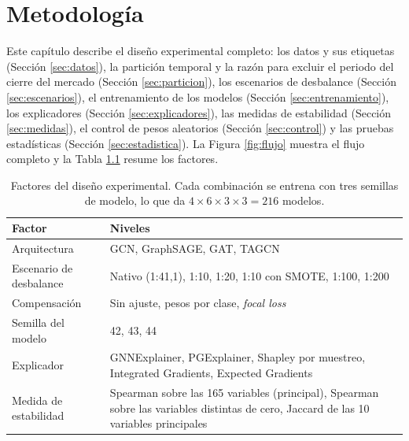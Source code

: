 \chapter{Metodología}\label{cap:metodologia}

Este capítulo describe el diseño experimental completo: los datos y sus etiquetas
(Sección \ref{sec:datos}), la partición temporal y la razón para excluir el periodo del
cierre del mercado (Sección \ref{sec:particion}), los escenarios de desbalance
(Sección \ref{sec:escenarios}), el entrenamiento de los modelos (Sección \ref{sec:entrenamiento}),
los explicadores (Sección \ref{sec:explicadores}), las medidas de estabilidad
(Sección \ref{sec:medidas}), el control de pesos aleatorios (Sección \ref{sec:control}) y las
pruebas estadísticas (Sección \ref{sec:estadistica}). La Figura \ref{fig:flujo} muestra el
flujo completo y la Tabla \ref{tab:diseno} resume los factores.

\begin{table}[ht]
\centering
\caption{Factores del diseño experimental. Cada combinación se entrena con tres semillas de
modelo, lo que da $4 \times 6 \times 3 \times 3 = 216$ modelos.}
\label{tab:diseno}
\small
\begin{tabularx}{\textwidth}{lX}
\toprule
Factor & Niveles \\
\midrule
Arquitectura & GCN, GraphSAGE, GAT, TAGCN \\
Escenario de desbalance & Nativo (1:41,1), 1:10, 1:20, 1:10 con SMOTE, 1:100, 1:200 \\
Compensación & Sin ajuste, pesos por clase, \textit{focal loss} \\
Semilla del modelo & 42, 43, 44 \\
Explicador & GNNExplainer, PGExplainer, Shapley por muestreo, Integrated Gradients,
Expected Gradients \\
Medida de estabilidad & Spearman sobre las 165 variables (principal), Spearman sobre las
variables distintas de cero, Jaccard de las 10 variables principales \\
\bottomrule
\end{tabularx}
\end{table}

